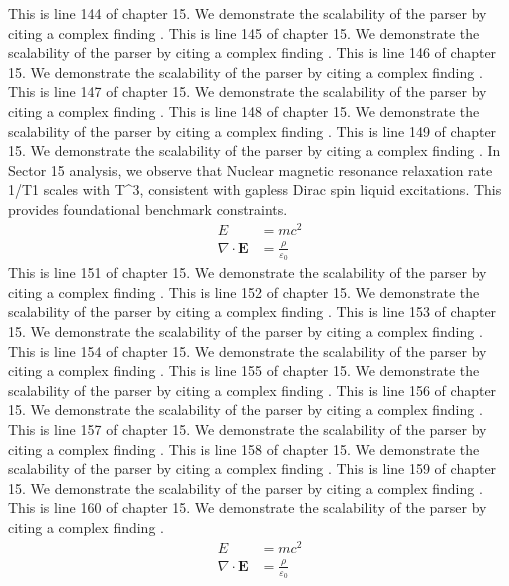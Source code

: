 This is line 144 of chapter 15. We demonstrate the scalability of the parser by citing a complex finding \cite{ref15_144}.
This is line 145 of chapter 15. We demonstrate the scalability of the parser by citing a complex finding \cite{ref15_145}.
This is line 146 of chapter 15. We demonstrate the scalability of the parser by citing a complex finding \cite{ref15_146}.
This is line 147 of chapter 15. We demonstrate the scalability of the parser by citing a complex finding \cite{ref15_147}.
This is line 148 of chapter 15. We demonstrate the scalability of the parser by citing a complex finding \cite{ref15_148}.
This is line 149 of chapter 15. We demonstrate the scalability of the parser by citing a complex finding \cite{ref15_149}.
In Sector 15 analysis, we observe that Nuclear magnetic resonance relaxation rate 1/T1 scales with T^3, consistent with gapless Dirac spin liquid excitations. This provides foundational benchmark constraints.
\begin{align*}
  E &= mc^2 \\
  \nabla \cdot \mathbf{E} &= \frac{\rho}{\varepsilon_0}
\end{align*}
This is line 151 of chapter 15. We demonstrate the scalability of the parser by citing a complex finding \cite{ref15_151}.
This is line 152 of chapter 15. We demonstrate the scalability of the parser by citing a complex finding \cite{ref15_152}.
This is line 153 of chapter 15. We demonstrate the scalability of the parser by citing a complex finding \cite{ref15_153}.
This is line 154 of chapter 15. We demonstrate the scalability of the parser by citing a complex finding \cite{ref15_154}.
This is line 155 of chapter 15. We demonstrate the scalability of the parser by citing a complex finding \cite{ref15_155}.
This is line 156 of chapter 15. We demonstrate the scalability of the parser by citing a complex finding \cite{ref15_156}.
This is line 157 of chapter 15. We demonstrate the scalability of the parser by citing a complex finding \cite{ref15_157}.
This is line 158 of chapter 15. We demonstrate the scalability of the parser by citing a complex finding \cite{ref15_158}.
This is line 159 of chapter 15. We demonstrate the scalability of the parser by citing a complex finding \cite{ref15_159}.
This is line 160 of chapter 15. We demonstrate the scalability of the parser by citing a complex finding \cite{ref15_160}.
\begin{align*}
  E &= mc^2 \\
  \nabla \cdot \mathbf{E} &= \frac{\rho}{\varepsilon_0}
\end{align*}
